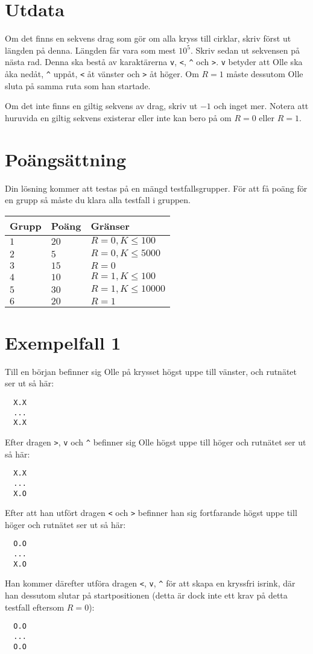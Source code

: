 \section*{Utdata}
Om det finns en sekvens drag som gör om alla kryss till cirklar, skriv först ut längden på denna.
Längden får vara som mest $10^5$.
Skriv sedan ut sekvensen på nästa rad. Denna ska bestå av karaktärerna \verb|v|, \verb|<|, \verb|^| och \verb|>|. 
\verb|v| betyder att Olle ska åka nedåt, \verb|^| uppåt, \verb|<| åt vänster
och \verb|>| åt höger. Om $R=1$ måste dessutom Olle sluta på samma ruta som han startade.

Om det inte finns en giltig sekvens av drag, skriv ut $-1$ och inget mer. 
Notera att huruvida en giltig sekvens existerar eller inte
kan bero på om $R=0$ eller $R=1$.


\section*{Poängsättning}
Din lösning kommer att testas på en mängd testfallsgrupper.
För att få poäng för en grupp så måste du klara alla testfall i gruppen.

\noindent
\begin{tabular}{| l | l | p{12cm} |}
  \hline
  \textbf{Grupp} & \textbf{Poäng} & \textbf{Gränser} \\ \hline
  $1$    & $20$       & $R=0, K \leq 100$ \\ \hline
  $2$    & $5$        & $R=0, K \leq 5000$ \\ \hline
  $3$    & $15$       & $R=0$ \\ \hline
  $4$    & $10$       & $R=1, K \leq 100$ \\ \hline
  $5$    & $30$       & $R=1, K \leq 10000$ \\ \hline
  $6$    & $20$       & $R=1$ \\ \hline
\end{tabular}

\section*{Exempelfall 1}
Till en början befinner sig Olle på krysset högst uppe till vänster, och rutnätet ser ut så här:
\noindent
\begin{verbatim}
  X.X
  ...
  X.X
\end{verbatim}
Efter dragen \verb|>|, \verb|v| och \verb|^| befinner sig Olle högst uppe till höger och rutnätet ser ut så här:
\noindent
\begin{verbatim}
  X.X
  ...
  X.O
\end{verbatim}
Efter att han utfört dragen \verb|<| och \verb|>| befinner han sig fortfarande högst uppe till höger och rutnätet ser ut så här:
\noindent
\begin{verbatim}
  O.O
  ...
  X.O
\end{verbatim}
Han kommer därefter utföra dragen \verb|<|, \verb|v|, \verb|^| för att skapa en kryssfri isrink, där han
dessutom slutar på startpositionen (detta är dock inte ett krav på detta testfall eftersom $R=0$):
\noindent
\begin{verbatim}
  O.O
  ...
  O.O
\end{verbatim}
